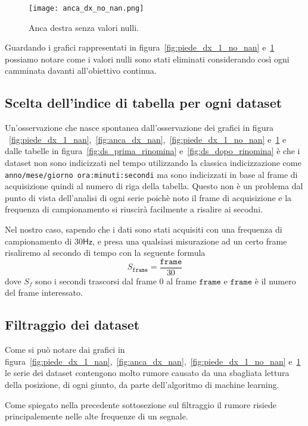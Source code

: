 \begin{figure}[H]
    \centering
    \texttt{[image: anca\_dx\_no\_nan.png]}
    \caption{Anca destra senza valori nulli.}
    \label{fig:anca_dx_no_nan}
\end{figure}

Guardando i grafici rappresentati in figura~\ref*{fig:piede_dx_1_no_nan} e~\ref*{fig:anca_dx_no_nan}
possiamo notare come i valori nulli sono stati eliminati considerando così ogni camminata 
davanti all'obiettivo continua.


\subsection{Scelta dell'indice di tabella per ogni dataset}
Un'osservazione che nasce spontanea dall'osservazione dei grafici in figura
~\ref*{fig:piede_dx_1_nan},~\ref*{fig:anca_dx_nan},~\ref*{fig:piede_dx_1_no_nan}
e~\ref*{fig:anca_dx_no_nan} e dalle tabelle in figura~\ref*{fig:ds_prima_rinomina}
e~\ref*{fig:ds_dopo_rinomina} è che i dataset non sono indicizzati nel tempo utilizzando
la classica indicizzazione come \texttt{anno/mese/giorno ora:minuti:secondi} ma sono indicizzati
in base al frame di acquisizione quindi al numero di riga della tabella.
Questo non è un problema dal punto di vista dell'analisi di ogni serie poichè noto il frame
di acquisizione e la frequenza di campionamento si riuscirà facilmente a risalire ai secodni.

Nel nostro caso, sapendo che i dati sono stati acquisiti con una frequenza di campionamento di 
$30\mathsf{Hz}$, e presa una qualsiasi misurazione ad un certo frame risaliremo al secondo
di tempo con la seguente formula
\[ S_\texttt{frame} = \frac{\texttt{frame}}{30} \]
dove $S_f$ sono i secondi trascorsi dal frame $0$ al frame $\texttt{frame}$ e $\texttt{frame}$ 
è il numero del frame interessato.


\subsection{Filtraggio dei dataset}
Come si può notare dai grafici in figura~\ref*{fig:piede_dx_1_nan},~\ref*{fig:anca_dx_nan},~\ref*{fig:piede_dx_1_no_nan}
e~\ref*{fig:anca_dx_no_nan} le serie dei dataset contengono molto rumore causato da una sbagliata 
lettura della posizione, di ogni giunto, da parte dell'algoritmo di machine learning.

Come spiegato nella precedente sottosezione sul filtraggio il rumore risiede principalemente nelle
alte frequenze di un segnale.

